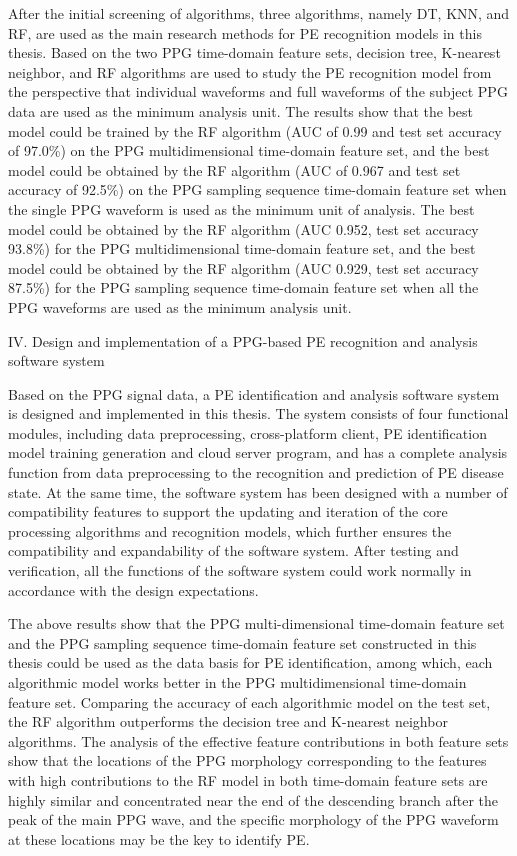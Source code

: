 After the initial screening of algorithms, three algorithms, namely DT, KNN, and RF, are used as the main research methods 
for PE recognition models in this thesis. Based on the two PPG time-domain feature sets, decision tree, K-nearest neighbor, and RF algorithms are 
used to study the PE recognition model from the perspective that individual waveforms and full waveforms of the subject PPG data are used as the minimum analysis unit. 
The results show that the best model could be trained by the RF algorithm (AUC of 0.99 and test set accuracy of 97.0\%) on the PPG multidimensional time-domain 
feature set, and the best model could be obtained by the RF algorithm (AUC of 0.967 and test set accuracy of 92.5\%) on the PPG sampling sequence time-domain 
feature set when the single PPG waveform is used as the minimum unit of analysis. The best model could be obtained by the RF algorithm (AUC 0.952, 
test set accuracy 93.8\%) for the PPG multidimensional time-domain feature set, and the best model could be obtained by the RF algorithm (AUC 0.929, 
test set accuracy 87.5\%) for the PPG sampling sequence time-domain feature set when all the PPG waveforms are used as the minimum analysis unit.

IV. Design and implementation of a PPG-based PE recognition and analysis software system

Based on the PPG signal data, a PE identification and analysis software system is designed and implemented in this thesis.
The system consists of four functional modules, including data preprocessing, cross-platform client, PE identification model training generation and cloud server program, 
and has a complete analysis function from data preprocessing to the recognition and prediction of PE disease state.
At the same time, the software system has been designed with a number of compatibility features to support the updating and iteration of the core processing 
algorithms and recognition models, which further ensures the compatibility and expandability of the software system.
After testing and verification, all the functions of the software system could work normally in accordance with the design expectations.

The above results show that the PPG multi-dimensional time-domain feature set and the PPG sampling sequence time-domain feature set constructed in this thesis 
could be used as the data basis for PE identification, among which, each algorithmic model works better in the PPG multidimensional time-domain feature set.
Comparing the accuracy of each algorithmic model on the test set, the RF algorithm outperforms 
the decision tree and K-nearest neighbor algorithms. The analysis of the effective feature contributions in both feature sets show that 
the locations of the PPG morphology corresponding to the features with high contributions to the RF 
model in both time-domain feature sets are highly similar and concentrated near the end of the descending branch after the peak of the main PPG wave, 
and the specific morphology of the PPG waveform at these locations may be the key to identify PE.

